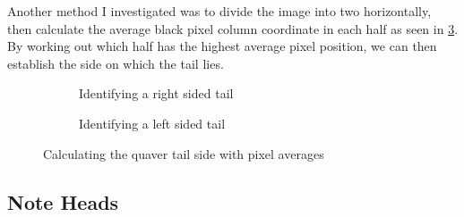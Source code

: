 Another method I investigated was to divide the image into two horizontally, then calculate the average black pixel column coordinate in each half as seen in \cref{fig:quaver-tail-average-position}. By working out which half has the highest average pixel position, we can then establish the side on which the tail lies.

\begin{figure}[h!]
    \centering

    \begin{subfigure}[b]{.45\linewidth}
        \centering
      \caption{Identifying a right sided tail}
      \label{fig:quaver-tail-average-position-right}
    \end{subfigure}
    \begin{subfigure}[b]{.45\linewidth}
        \centering
      \caption{Identifying a left sided tail}
      \label{fig:quaver-tail-average-position-left}
    \end{subfigure}

      \caption{Calculating the quaver tail side with pixel averages}
      \label{fig:quaver-tail-average-position}
\end{figure}

\subsection{Note Heads}
